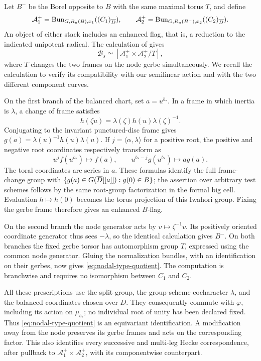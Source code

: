 Let $B^-$ be the Borel opposite to $B$ with the same maximal torus
$T$, and define
\[
 \mathcal A_1^+=\operatorname{Bun}_{G,R_u(B),x_1}((C_1)_{\overline D}),
 \qquad
 \mathcal A_2^+=\operatorname{Bun}_{G,R_u(B^-),x_2}((C_2)_{\overline D}).
\]
An object of either stack includes an enhanced flag, that is, a
reduction to the indicated unipotent radical.  The calculation of
\cite[Lemma~8.2]{CT} gives
\begin{equation}\label{eq:nodal-type-quotient}
 \mathcal B_s\simeq
       [\mathcal A_1^+\times\mathcal A_2^+/T],
\end{equation}
where $T$ changes the two frames on the node gerbe simultaneously.
We recall the calculation to verify its compatibility with our
semilinear action and with the two different component curves.

On the first branch of the balanced chart, set $a=u^{b_*}$.
In a frame in which inertia is $\lambda$, a change of frame satisfies
\[
 h(\zeta u)=\lambda(\zeta)h(u)\lambda(\zeta)^{-1}.
\]
Conjugating to the invariant punctured-disc frame gives
$g(a)=\lambda(u)^{-1}h(u)\lambda(u)$.  If
$j=\langle\alpha,\lambda\rangle$ for a positive root, the positive
and negative root coordinates respectively transform as
\begin{equation}\label{eq:nodal-root-coordinate}
 u^j f(u^{b_*})\longmapsto f(a),
 \qquad
 u^{b_*-j}g(u^{b_*})\longmapsto a g(a).
\end{equation}
The toral coordinates are series in $a$.  These formulas identify
the full frame-change group with
$\{g(a)\in G(\overline D[[a]]):g(0)\in B\}$; the assertion over arbitrary
test schemes follows by the same root-group factorization in the
formal big cell.  Evaluation $h\mapsto h(0)$ becomes the torus
projection of this Iwahori group.  Fixing the gerbe frame therefore
gives an enhanced $B$-flag.

On the second branch the node generator acts by
$v\mapsto\zeta^{-1}v$.  Its positively oriented coordinate generator
thus sees $-\lambda$, so the identical calculation gives $B^-$.
On both branches the fixed gerbe torsor has automorphism group $T$,
expressed using the common node generator.  Gluing the normalization bundles, with an
identification on their gerbes, now gives
\eqref{eq:nodal-type-quotient}.  The computation is branchwise and
requires no isomorphism between $C_1$ and $C_2$.

All these prescriptions use the split group, the group-scheme
cocharacter $\lambda$, and the balanced coordinates chosen over
$D$.  They consequently commute with $\varphi$, including its
action on $\mu_{b_*}$; no individual root of unity has been declared
fixed.  Thus \eqref{eq:nodal-type-quotient} is an equivariant
identification.  A modification away from the node preserves its
gerbe frames and acts on the corresponding factor.  This also
identifies every successive and multi-leg Hecke correspondence,
after pullback to $\mathcal A_1^+\times\mathcal A_2^+$, with its
componentwise counterpart.

